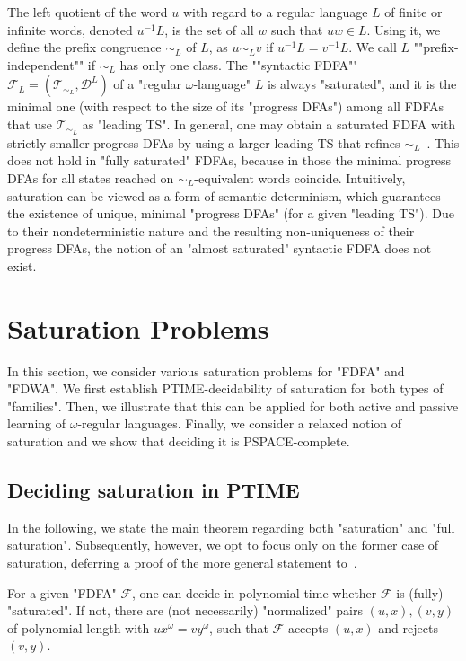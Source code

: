 \documentclass[a4paper,USenglish,cleveref,autoref,thm-restate]{lipics-v2021}
\newcommand{\mc}[1]{\ensuremath{\mathcal{#1}}}
\newcommand{\T}{\mc{T}}
\newcommand{\F}{\mc{F}}
\newcommand{\D}{\mc{D}}
\newcommand{\PSPACE}{\textsf{PSPACE}\xspace}
\newcommand{\PTIME}{\textsf{PTIME}\xspace}
\newcommand{\ifappendixelse}[2]{\ifthenelse{\isundefined{\shouldhaveappendix}}{#2}{#1}}
\newcommand*{\shouldhaveappendix}{}
\begin{document}
The left quotient of the word $u$ with regard to a regular language $L$ of finite or infinite words, denoted $u^{-1}L$, is the set of all $w$ such that $uw \in L$.
Using it, we define the prefix congruence $\sim_L$ of $L$, as $u \sim_L v$ if $u^{-1}L = v^{-1}L$.
\AP 
We call $L$ ""prefix-independent"" if $\sim_L$ has only one class.
\AP
The ""syntactic FDFA"" $\F_L = (\T_{\sim_L}, \D^L)$ of a "regular $\omega$-language" $L$ is always "saturated", and it is the minimal one (with respect to the size of its "progress DFAs") among all FDFAs that use $\T_{\sim_L}$ as "leading TS".
In general, one may obtain a saturated FDFA with strictly smaller progress DFAs by using a larger leading TS that refines $\sim_L$~\cite[Proposition~2]{Klarlund94}.
This does not hold in "fully saturated" FDFAs, because in those the minimal progress DFAs for all states reached on $\sim_L$-equivalent words coincide.
Intuitively, saturation can be viewed as a form of semantic determinism, which guarantees the existence of unique, minimal "progress DFAs" (for a given "leading TS").
Due to their nondeterministic nature and the resulting non-uniqueness of their progress DFAs, the notion of an "almost saturated" syntactic FDFA does not exist.
%
 \section{Saturation Problems}\label{sec:saturation}

In this section, we consider various saturation problems for "FDFA" and "FDWA".
We first establish \PTIME-decidability of saturation for both types of "families".
Then, we illustrate that this can be applied for both active and passive learning of $\omega$-regular languages.
Finally, we consider a relaxed notion of saturation and we show that deciding it is \PSPACE-complete. 

\subsection{Deciding saturation in \PTIME}\label{section:ptimesaturation}
In the following, we state the main theorem regarding both "saturation" and "full saturation".
Subsequently, however, we opt to focus only on the former case of saturation, deferring a proof of the more general statement to~\ifappendixelse{\cref{section:appendixsaturation}}{the full version}.

\begin{theorem}
    For a given "FDFA" $\F$, one can decide in polynomial time whether $\F$ is (fully) "saturated".
    If not, there are (not necessarily) "normalized" pairs $(u,x),(v,y)$ of polynomial length with $ux^\omega = vy^\omega$, such that $\F$ accepts $(u,x)$ and rejects $(v,y)$.\label{theorem:ptimesaturationFDFA}
\end{theorem}
\end{document}
